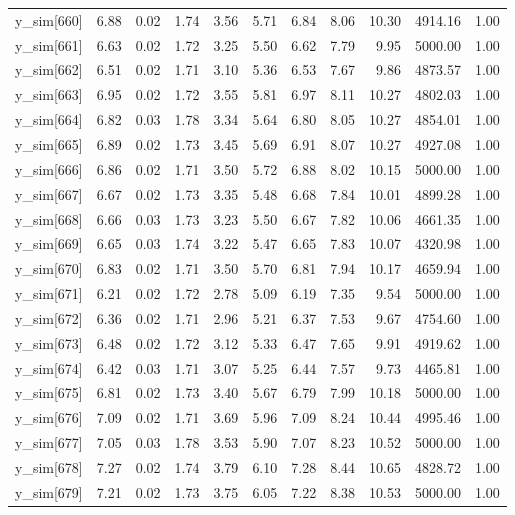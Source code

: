 \begin{table}[ht]
\begin{tabular}{rrrrrrrrrrr}
  y\_sim[660] & 6.88 & 0.02 & 1.74 & 3.56 & 5.71 & 6.84 & 8.06 & 10.30 & 4914.16 & 1.00 \\ 
  y\_sim[661] & 6.63 & 0.02 & 1.72 & 3.25 & 5.50 & 6.62 & 7.79 & 9.95 & 5000.00 & 1.00 \\ 
  y\_sim[662] & 6.51 & 0.02 & 1.71 & 3.10 & 5.36 & 6.53 & 7.67 & 9.86 & 4873.57 & 1.00 \\ 
  y\_sim[663] & 6.95 & 0.02 & 1.72 & 3.55 & 5.81 & 6.97 & 8.11 & 10.27 & 4802.03 & 1.00 \\ 
  y\_sim[664] & 6.82 & 0.03 & 1.78 & 3.34 & 5.64 & 6.80 & 8.05 & 10.27 & 4854.01 & 1.00 \\ 
  y\_sim[665] & 6.89 & 0.02 & 1.73 & 3.45 & 5.69 & 6.91 & 8.07 & 10.27 & 4927.08 & 1.00 \\ 
  y\_sim[666] & 6.86 & 0.02 & 1.71 & 3.50 & 5.72 & 6.88 & 8.02 & 10.15 & 5000.00 & 1.00 \\ 
  y\_sim[667] & 6.67 & 0.02 & 1.73 & 3.35 & 5.48 & 6.68 & 7.84 & 10.01 & 4899.28 & 1.00 \\ 
  y\_sim[668] & 6.66 & 0.03 & 1.73 & 3.23 & 5.50 & 6.67 & 7.82 & 10.06 & 4661.35 & 1.00 \\ 
  y\_sim[669] & 6.65 & 0.03 & 1.74 & 3.22 & 5.47 & 6.65 & 7.83 & 10.07 & 4320.98 & 1.00 \\ 
  y\_sim[670] & 6.83 & 0.02 & 1.71 & 3.50 & 5.70 & 6.81 & 7.94 & 10.17 & 4659.94 & 1.00 \\ 
  y\_sim[671] & 6.21 & 0.02 & 1.72 & 2.78 & 5.09 & 6.19 & 7.35 & 9.54 & 5000.00 & 1.00 \\ 
  y\_sim[672] & 6.36 & 0.02 & 1.71 & 2.96 & 5.21 & 6.37 & 7.53 & 9.67 & 4754.60 & 1.00 \\ 
  y\_sim[673] & 6.48 & 0.02 & 1.72 & 3.12 & 5.33 & 6.47 & 7.65 & 9.91 & 4919.62 & 1.00 \\ 
  y\_sim[674] & 6.42 & 0.03 & 1.71 & 3.07 & 5.25 & 6.44 & 7.57 & 9.73 & 4465.81 & 1.00 \\ 
  y\_sim[675] & 6.81 & 0.02 & 1.73 & 3.40 & 5.67 & 6.79 & 7.99 & 10.18 & 5000.00 & 1.00 \\ 
  y\_sim[676] & 7.09 & 0.02 & 1.71 & 3.69 & 5.96 & 7.09 & 8.24 & 10.44 & 4995.46 & 1.00 \\ 
  y\_sim[677] & 7.05 & 0.03 & 1.78 & 3.53 & 5.90 & 7.07 & 8.23 & 10.52 & 5000.00 & 1.00 \\ 
  y\_sim[678] & 7.27 & 0.02 & 1.74 & 3.79 & 6.10 & 7.28 & 8.44 & 10.65 & 4828.72 & 1.00 \\ 
  y\_sim[679] & 7.21 & 0.02 & 1.73 & 3.75 & 6.05 & 7.22 & 8.38 & 10.53 & 5000.00 & 1.00 \\ 

\end{tabular}
\end{table}
